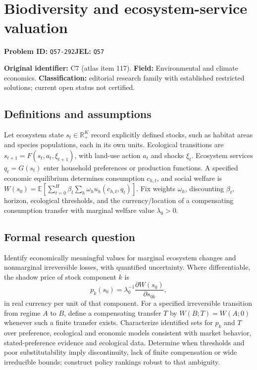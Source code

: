 \documentclass[11pt,a4paper]{article}
\begin{document}
\section*{Biodiversity and ecosystem-service valuation}
\textbf{Problem ID:} \texttt{Q57-292}\quad \textbf{JEL:} \texttt{Q57}\par
\label{problem:OP-0117}
\label{audited:ECON-058}


\label{atlas:prob:C7}

\noindent\textbf{Original identifier:} C7 (atlas item 117). \textbf{Field:} Environmental and climate economics. \textbf{Classification:} editorial research family with established restricted solutions; current open status not certified.

\subsection*{Definitions and assumptions}

Let ecosystem state $s_t\in\mathbb R_+^K$ record explicitly defined stocks, such as habitat areas and species populations, each in its own units. Ecological transitions are $s_{t+1}=F(s_t,a_t,\xi_{t+1})$, with land-use action $a_t$ and shocks $\xi_t$. Ecosystem services $q_t=G(s_t)$ enter household preferences or production functions. A specified economic equilibrium determines consumption $c_{h,t}$, and social welfare is $W(s_0)=\mathbb E[\sum_{t=0}^H\beta_t\sum_h\omega_hu_h(c_{h,t},q_t)]$. Fix weights $\omega_h$, discounting $\beta_t$, horizon, ecological thresholds, and the currency/location of a compensating consumption transfer with marginal welfare value $\lambda_0>0$.

\subsection*{Formal research question}

Identify economically meaningful values for marginal ecosystem changes and nonmarginal irreversible losses, with quantified uncertainty. Where differentiable, the shadow price of stock component $k$ is
\[
p_k(s_0)=\lambda_0^{-1}\frac{\partial W(s_0)}{\partial s_{0k}},
\]
in real currency per unit of that component. For a specified irreversible transition from regime $A$ to $B$, define a compensating transfer $T$ by $W(B;T)=W(A;0)$ whenever such a finite transfer exists. Characterize identified sets for $p_k$ and $T$ over preference, ecological and economic models consistent with market behavior, stated-preference evidence and ecological data. Determine when thresholds and poor substitutability imply discontinuity, lack of finite compensation or wide irreducible bounds; construct policy rankings robust to that ambiguity.
\end{document}
